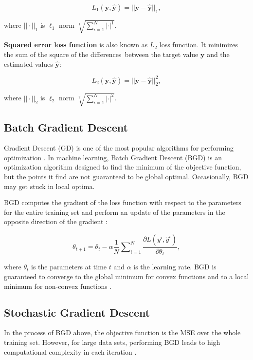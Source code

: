 \documentclass[
	parskip, 			   %
	twoside, 			   %
	DIV=14, 			   %
	BCOR=15.0mm, 		   %
	headsepline, 		   %
	open=right, 		   %
	captions=tableheading, %
	bibliography=totoc,    %
	numbers=noenddot       %
]{scrreprt}
\begin{document}
\begin{equation}
    \label{eq:AE_loss}
    L_{1}( \mathbf{y}, \hat{\mathbf{y}} ) = ||\mathbf{y}-\hat{\mathbf{y}}||_{1},
\end{equation}

where $|| \cdot ||_{1}$ is $\ell_1$ norm $\sqrt[1]{\sum_{i=1}^N | \cdot |^1}$.

\textbf{Squared error loss function} is also known as $L_{2}$ loss function. It minimizes the sum of the square of the differences between the target value $\mathbf{y}$ and the estimated values $\hat{\mathbf{y}}$:

\begin{equation}
    \label{eq:SE_loss}
    L_{2} ( \mathbf{y}, \hat{\mathbf{y}} ) = ||\mathbf{y}-\hat{\mathbf{y}}||^{2}_{2},
\end{equation}

where $|| \cdot ||_{2}$ is $\ell_2$ norm $\sqrt[2]{\sum_{i=1}^N | \cdot |^2}$.


\subsection{Batch Gradient Descent}
Gradient Descent (GD) is one of the most popular algorithms for performing optimization \cite{ruder2016overview}. In machine learning, Batch Gradient Descent (BGD) is an optimization algorithm designed to find the minimum of the objective function, but the points it find are not guaranteed to be global optimal. Occasionally, BGD may get stuck in local optima.

BGD computes the gradient of the loss function with respect to the parameters for the entire training set and perform an update of the parameters in the opposite direction of the gradient \cite{ruder2016overview}:

\begin{equation}
    \label{eq:GD}
    \theta_{t+1} = \theta_{t} - \alpha \frac{1}{N} \sum\nolimits_{i=1}^N  \frac{\partial L (y^i, \hat{y}^i)}{\partial \theta_{t}},
\end{equation}

where $\theta_{t}$ is the parameters at time $t$ and $\alpha$ is the learning rate. BGD is guaranteed to converge to the global minimum for convex functions and to a local minimum for non-convex functions \cite{ruder2016overview}.

\subsection{Stochastic Gradient Descent}
In the process of BGD above, the objective function is the MSE over the whole training set. However, for large data sets, performing BGD leads to high computational complexity in each iteration \cite{sun2019survey}.
\end{document}
